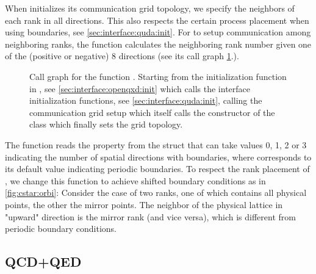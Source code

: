When \quda initializes its communication grid topology, we specify the neighbors of each rank in all directions. This also respects the certain process placement when using \Cstar boundaries, see \cref{sec:interface:quda:init}. For \quda to setup communication among neighboring ranks, the function  calculates the neighboring rank number given one of the (positive or negative) 8 directions (see its call graph \cref{fig:comm_rank_displaced}.).
\begin{figure}
  
  \caption{Call graph for the function . Starting from the initialization function  in \openqxd, see \cref{sec:interface:openqxd:init} which calls the interface initialization functions, see \cref{sec:interface:quda:init}, calling the communication grid setup which itself calls the constructor of the  class which finally sets the grid topology.}
  \label{fig:comm_rank_displaced}
\end{figure}
The function reads the  property from the  struct that can take values \num{0}, \num{1}, \num{2} or \num{3} indicating the number of spatial directions with \Cstar boundaries, where  corresponds to its default value indicating periodic boundaries.
To respect the rank placement of \openqxd, we change this function to achieve shifted boundary conditions as in \cref{fig:cstar:orbi}: Consider the case of two ranks, one of which contains all physical points, the other the mirror points. The neighbor of the physical lattice in "upward" direction is the mirror rank (and vice versa), which is different from periodic boundary conditions.

\subsection{QCD+QED}
\label{sec:interface:qcd+qed}


